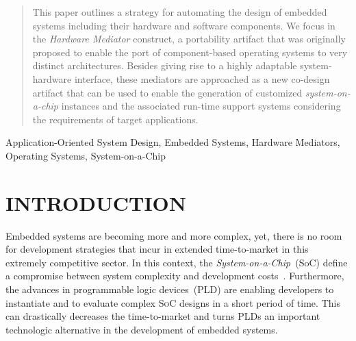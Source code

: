 \documentclass{kapproc} %
\begin{document}


\author{Fauze V. Polpeta and Ant\^onio A. Fr\"ohlich}

\begin{abstract}

 This paper outlines a strategy for automating the design of embedded
 systems including their hardware and software components. We focus in
 the \emph{Hardware Mediator} construct, a portability artifact that
 was originally proposed to enable the port of component-based
 operating systems to very distinct architectures. Besides giving rise
 to a highly adaptable system-hardware interface, these mediators are
 approached as a new co-design artifact that can be used to enable the
 generation of customized \emph{system-on-a-chip} instances and the
 associated run-time support systems considering the requirements of
 target applications.

\end{abstract}

\begin{keywords}
 Application-Oriented System Design, Embedded Systems, Hardware
 Mediators, Operating Systems, System-on-a-Chip
\end{keywords}

\section{INTRODUCTION}

 Embedded systems are becoming more and more complex, yet, there is no
 room for development strategies that incur in extended time-to-market
 in this extremely competitive sector. In this context, the
 \emph{System-on-a-Chip}~(SoC) define a compromise between system
 complexity and development
 costs~\cite{Bergamaschi:2001}. Furthermore, the advances in
 programmable logic devices~(\textsc{PLD}) are enabling developers to
 instantiate and to evaluate complex \textsc{SoC} designs in a short
 period of time. This can drastically decreases the time-to-market and
 turns \textsc{PLD}s an important technologic alternative in the
 development of embedded systems.
\end{document}
